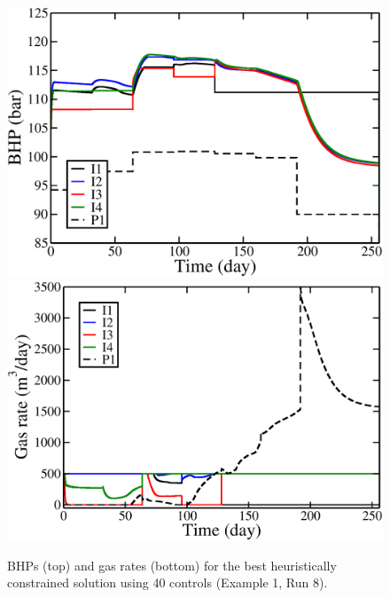 \begin{figure}
\begin{center}
\includegraphics[totalheight=2.2in,angle=0]{figures/HeuristicC500Steps8OptimalItPm_BHP.pdf}
\includegraphics[totalheight=2.17in,angle=0]{figures/HeuristicC500Steps8OptimalItPm_rate_gas.pdf}
\end{center}
\caption{BHPs (top) and gas rates (bottom) for the best heuristically constrained solution using 40 controls (Example 1, Run 8).}
\label{fig:PIHeuristicControls40Plots}
\end{figure}

